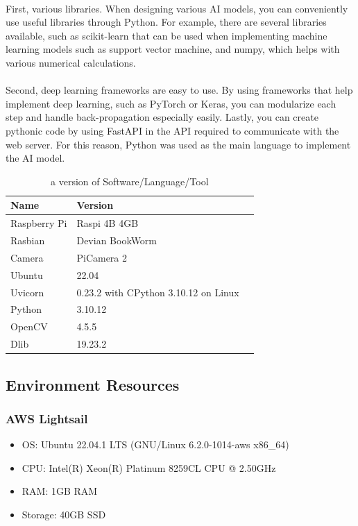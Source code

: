 \\
First, various libraries. When designing various AI models, you can conveniently use useful libraries through Python. For example, there are several libraries available, such as scikit-learn that can be used when implementing machine learning models such as support vector machine, and numpy, which helps with various numerical calculations. \\

\\
Second, deep learning frameworks are easy to use. By using frameworks that help implement deep learning, such as PyTorch or Keras, you can modularize each step and handle back-propagation especially easily. Lastly, you can create pythonic code by using FastAPI in the API required to communicate with the web server. For this reason, Python was used as the main language to implement the AI model.\\




\begin{table}[h]
    \caption{a version of Software/Language/Tool}
    \begin{tabular}{|p{2.6cm}|p{1.7cm}|p{3.4cm}|}
    \hline
    Name & Version \\ \hline
      Raspberry Pi & Raspi 4B 4GB \\ \hline
      Rasbian & Devian BookWorm \\ \hline
      Camera & PiCamera 2\\ \hline
      Ubuntu & 22.04\\ \hline
      Uvicorn & 0.23.2 with CPython 3.10.12 on Linux\\ \hline
      Python & 3.10.12 \\ \hline
      OpenCV & 4.5.5 \\ \hline
      Dlib & 19.23.2 \\ \hline
      
    \end{tabular}
    \end{table}


\subsection{\textbf{Environment Resources}}
\subsubsection{\textbf{AWS Lightsail}}
\begin{itemize}
    \item OS: Ubuntu 22.04.1 LTS (GNU/Linux 6.2.0-1014-aws x86\_64)
    \item CPU: Intel(R) Xeon(R) Platinum 8259CL CPU @ 2.50GHz
    \item RAM: 1GB RAM
    \item Storage: 40GB SSD
\end{itemize}
